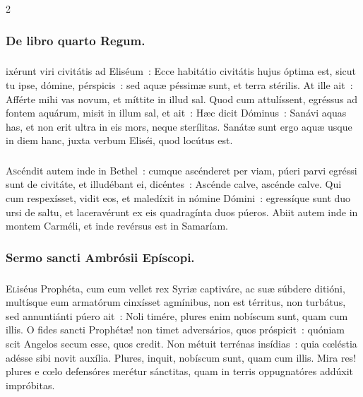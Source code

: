 \documentclass[9pt,twoside]{extarticle}
\begin{document}
\begin{multicols}{2}
\subsubsection*{\center {}}

\subsubsection*{\center De libro quarto Regum.}
\subsubsection*{\center {}}
ixérunt viri civitátis ad Eliséum~: Ecce habitátio civitátis hujus óptima est, sicut tu ipse, dómine, pérspicis~: sed aquæ péssimæ sunt, et terra stérilis.
At ille ait~: Afférte mihi vas novum, et míttite in illud sal. Quod cum attulíssent,
egréssus ad fontem aquárum, misit in illum sal, et ait~: Hæc dicit Dóminus~: Sanávi aquas has, et non erit ultra in eis mors, neque sterílitas.
Sanátæ sunt ergo aquæ usque in diem hanc, juxta verbum Eliséi, quod locútus est.

\begin{tightlist}{}
\item {} 
\end{tightlist}

\subsubsection*{\center {}}
\lettrine{A}scéndit autem inde in Bethel~: cumque ascénderet per viam, púeri parvi egréssi sunt de civitáte, et illudébant ei, dicéntes~: Ascénde calve, ascénde calve.
Qui cum respexísset, vidit eos, et maledíxit in nómine Dómini~: egressíque sunt duo ursi de saltu, et laceravérunt ex eis quadragínta duos púeros.
Abiit autem inde in montem Carméli, et inde revérsus est in Samaríam.

\subsubsection*{\center Sermo sancti Ambrósii Epíscopi.}
\subsubsection*{\center{}}
\lettrine{E}liséus Prophéta, cum eum vellet rex Syriæ captiváre, ac suæ súbdere ditióni, multísque eum armatórum cinxísset agmínibus, non est térritus, non turbátus, sed annuntiánti púero ait~: Noli timére, plures enim nobíscum sunt, quam cum illis. O fides sancti Prophétæ! non timet adversários, quos próspicit~: quóniam scit Angelos secum esse, quos credit. Non métuit terrénas insídias~: quia cœléstia adésse sibi novit auxília. Plures, inquit, nobíscum sunt, quam cum illis. Mira res! plures e cœlo defensóres merétur sánctitas, quam in terris oppugnatóres addúxit impróbitas.


\end{multicols}
\end{document}
